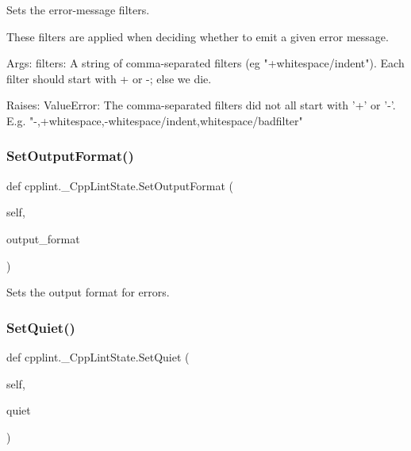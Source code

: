 \begin{DoxyVerb}Sets the error-message filters.

These filters are applied when deciding whether to emit a given
error message.

Args:
  filters: A string of comma-separated filters (eg "+whitespace/indent").
       Each filter should start with + or -; else we die.

Raises:
  ValueError: The comma-separated filters did not all start with '+' or '-'.
          E.g. "-,+whitespace,-whitespace/indent,whitespace/badfilter"
\end{DoxyVerb}
 \mbox{\label{classcpplint_1_1__CppLintState_ab43553d2e2027b58d08a7001c71c0902}} 
\subsubsection{\texorpdfstring{Set\+Output\+Format()}{SetOutputFormat()}}
{\footnotesize\ttfamily def cpplint.\+\_\+\+Cpp\+Lint\+State.\+Set\+Output\+Format (\begin{DoxyParamCaption}\item[{}]{self,  }\item[{}]{output\+\_\+format }\end{DoxyParamCaption})}

\begin{DoxyVerb}Sets the output format for errors.\end{DoxyVerb}
 \mbox{\label{classcpplint_1_1__CppLintState_ae97361d7a7428a9788e8200ae2e20374}} 
\subsubsection{\texorpdfstring{Set\+Quiet()}{SetQuiet()}}
{\footnotesize\ttfamily def cpplint.\+\_\+\+Cpp\+Lint\+State.\+Set\+Quiet (\begin{DoxyParamCaption}\item[{}]{self,  }\item[{}]{quiet }\end{DoxyParamCaption})}

